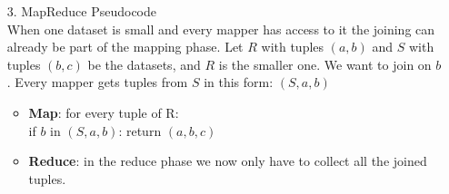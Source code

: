 \documentclass[11pt,a4paper]{scrartcl}
\begin{document}
\begin{itemize}
		\item[3.] MapReduce Pseudocode \\
		When one dataset is small and every mapper has access to it the joining can already be part of the mapping phase. Let $R$ with tuples $(a,b)$ and $S$ with tuples $(b,c)$ be the datasets, and $R$ is the smaller one. We want to join on $b$. Every mapper gets tuples from $S$ in this form: $(S,a,b)$
		\begin{itemize}
			\item \textbf{Map}: for every tuple of R: \\
			if $b$ in $(S,a,b)$: return $(a,b,c)$
			\item \textbf{Reduce}: in the reduce phase we now only have to collect all the joined tuples. 
		\end{itemize}



	\end{itemize}
	
\end{document}
